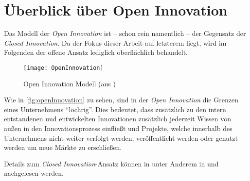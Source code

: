 \section{Überblick über Open Innovation}\label{sec:grundlagen-open}

Das Modell der \textit{Open Innovation} ist -- schon rein namentlich -- der Gegensatz der \textit{Closed Innovation}.
Da der Fokus dieser Arbeit auf letzterem liegt,
wird im Folgenden der offene Ansatz lediglich oberflächlich behandelt.

\begin{figure}[ht!]
    \centering
    \texttt{[image: OpenInnovation]}
    \caption{Open Innovation Modell (aus \cite[23]{herzog2011})}
    \label{fig:openInnovation}
\end{figure}

Wie in \autoref{fig:openInnovation} zu sehen,
sind in der \textit{Open Innovation} die Grenzen eines Unternehmens \enquote{löchrig}.
Dies bedeutet, dass zusätzlich zu den intern entstandenen und entwickelten Innovationen
zusätzlich jederzeit Wissen von außen in den Innovationsprozess einfließt
und Projekte, welche innerhalb des Unternehmens nicht weiter verfolgt werden,
veröffentlicht werden oder genutzt werden um neue Märkte zu erschließen.

Details zum \textit{Closed Innovation}-Ansatz können in unter Anderem
in \cite[60\psqq]{chesbrough2003} und \cite[21\psqq]{herzog2011} nachgelesen werden.